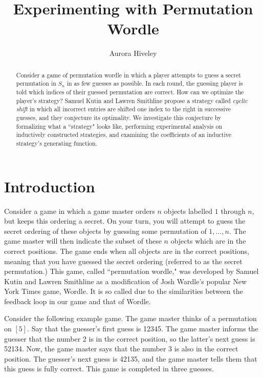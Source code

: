 \documentclass[article]{amsart}
\title{Experimenting with Permutation Wordle}
\author[Hiveley]{Aurora Hiveley}
\theoremstyle{definition}
\theoremstyle{definition}
\theoremstyle{remark}
\begin{document}
\begin{abstract}
Consider a game of permutation wordle in which a player attempts to guess a secret permutation in $S_n$ in as few guesses as possible. In each round, the guessing player is told which indices of their guessed permutation are correct. How can we optimize the player's strategy? Samuel Kutin and Lawren Smithline propose a strategy called \textit{cyclic shift} in which all incorrect entries are shifted one index to the right in successive guesses, and they conjecture its optimality. We investigate this conjecture by formalizing what a ``strategy" looks like, performing experimental analysis on inductively constructed strategies, and examining the coefficients of an inductive strategy's generating function. 
\end{abstract}


\maketitle


\section{Introduction} 
Consider a game in which a game master orders $n$ objects labelled $1$ through $n$, but keeps this ordering a secret. On your turn, you will attempt to guess the secret ordering of these objects by guessing some permutation of $1, \dots, n$. The game master will then indicate the subset of these $n$ objects which are in the correct positions. The game ends when all objects are in the correct positions, meaning that you have guessed the secret ordering (referred to as the secret permutation.) This game, called ``permutation wordle," was developed by Samuel Kutin and Lawren Smithline \cite{kutin2024permutationwordle} as a modification of Josh Wardle's popular New York Times game, Wordle. It is so called due to the similarities between the feedback loop in our game and that of Wordle. 

Consider the following example game. The game master thinks of a permutation on $[5]$. Say that the guesser's first guess is 12345. The game master informs the guesser that the number 2 is in the correct position, so the latter's next guess is 52134. Now, the game master says that the number 3 is also in the correct position. The guesser's next guess is 42135, and the game master tells them that this guess is fully correct. This game is completed in three guesses. 
\end{document}
